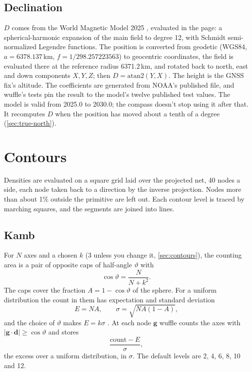 \subsection{Declination}\label{sec:m-wmm}

$D$ comes from the World Magnetic Model 2025 \parencite{chulliat2025}, evaluated in the page: a
spherical-harmonic expansion of the main field to degree 12, with Schmidt semi-normalized Legendre
functions. The position is converted from geodetic (WGS84, $a = 6378.137$\,km, $f = 1/298.257223563$) to
geocentric coordinates, the field is evaluated there at the reference radius 6371.2\,km, and rotated
back to north, east and down components $X, Y, Z$; then $D = \mathrm{atan2}(Y, X)$. The height is the
GNSS fix's altitude. The coefficients are generated from NOAA's published file, and wuffle's tests pin
the result to the model's twelve published test values. The model is valid from 2025.0 to 2030.0; the
compass doesn't stop using it after that. It recomputes $D$ when the position has moved about a tenth
of a degree (\cref{sec:true-north}).

\section{Contours}\label{sec:m-contours}

Densities are evaluated on a square grid laid over the projected net, 40 nodes a side, each node taken
back to a direction by the inverse projection. Nodes more than about 1\% outside the primitive are left
out. Each contour level is traced by marching squares, and the segments are joined into lines.

\subsection{Kamb}

For $N$ axes and a chosen $k$ (3 unless you change it, \cref{sec:contours}), the counting area is a pair
of opposite caps of half-angle $\vartheta$ with
\[ \cos\vartheta = \frac{N}{N + k^2}. \]
The caps cover the fraction $A = 1 - \cos\vartheta$ of the sphere. For a uniform distribution the count
in them has expectation and standard deviation
\[ E = NA, \qquad \sigma = \sqrt{NA(1 - A)}, \]
and the choice of $\vartheta$ makes $E = k\sigma$ \parencite{kamb1959}. At each node $\mathbf{g}$ wuffle
counts the axes with $|\mathbf{g} \cdot \mathbf{d}| \ge \cos\vartheta$ and stores
\[ \frac{\mathrm{count} - E}{\sigma}, \]
the excess over a uniform distribution, in $\sigma$. The default levels are 2, 4, 6, 8, 10 and 12.

